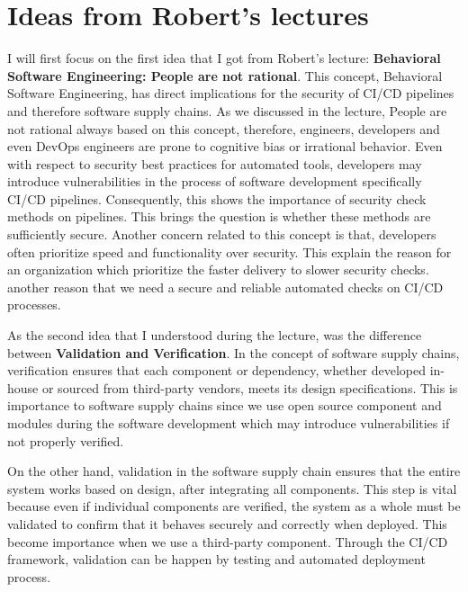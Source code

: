 \documentclass[11pt]{article}
\begin{document}
\section{Ideas from Robert's lectures}
I will first focus on the first idea that I got from Robert's lecture: \textbf{Behavioral Software Engineering:
People are not rational}. 
This concept, Behavioral Software Engineering, has direct implications for the security of CI/CD pipelines and therefore software supply chains. As we discussed in the lecture, People are not rational always based on this concept, therefore, engineers, developers and even DevOps engineers are prone to cognitive bias or irrational behavior. Even with respect to security best practices for automated tools, developers may introduce vulnerabilities in the process of software development specifically CI/CD pipelines. Consequently, this shows the importance of security check methods on pipelines. This brings the question is whether these methods are sufficiently secure. Another concern related to this concept is that, developers often prioritize speed and functionality over security. This explain the reason for an organization which prioritize the faster delivery to slower security checks. another reason that we need a secure and reliable automated checks on CI/CD processes. 

As the second idea that I understood during the lecture, was the difference between \textbf{Validation and Verification}. In the concept of software supply chains,  verification ensures that each component or dependency, whether developed in-house or sourced from third-party vendors, meets its design specifications. This is importance to software supply chains since we use open source component and modules during the software development which may introduce vulnerabilities if not properly verified.

On the other hand, validation in the software supply chain ensures that the entire system works based on design, after integrating all components. This step is vital because even if individual components are verified, the system as a whole must be validated to confirm that it behaves securely and correctly when deployed. This become importance when we use a third-party component. Through the CI/CD framework, validation can be happen by testing and automated deployment process. 
\end{document}
